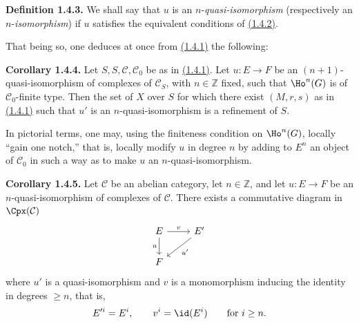 \textbf{Definition 1.4.3.} We shall say that \(u\) is an \(n\)-\emph{quasi-isomorphism} (respectively an \(n\)-\emph{isomorphism}) if \(u\) satisfies the equivalent conditions of \hyperlink{sga6.e01.lem.1-4-2}{(1.4.2)}.

That being so, one deduces at once from \hyperlink{sga6.e01.prop.1-4-1}{(1.4.1)} the following:

\textbf{Corollary 1.4.4.} Let \(S,S,\mathcal C,\mathcal C_0\) be as in \hyperlink{sga6.e01.prop.1-4-1}{(1.4.1)}. Let \(u:E\to F\) be an \((n+1)\)-quasi-isomorphism of complexes of \(\mathcal C_S\), with \(n\in\mathbb Z\) fixed, such that \(\Ho^n(G)\) is of \(\mathcal C_0\)-finite type. Then the set of \(X\) over \(S\) for which there exist \((M,r,s)\) as in \hyperlink{sga6.e01.prop.1-4-1}{(1.4.1)} such that \(u'\) is an \(n\)-quasi-isomorphism is a refinement of \(S\).

In pictorial terms, one may, using the finiteness condition on \(\Ho^n(G)\), locally ``gain one notch,'' that is, locally modify \(u\) in degree \(n\) by adding to \(E^n\) an object of \(\mathcal C_0\) in such a way as to make \(u\) an \(n\)-quasi-isomorphism.

\textbf{Corollary 1.4.5.} Let \(\mathcal C\) be an abelian category, let \(n\in\mathbb Z\), and let \(u:E\to F\) be an \(n\)-quasi-isomorphism of complexes of \(\mathcal C\). There exists a commutative diagram in \(\Cpx(\mathcal C)\)
\[
\begin{tikzcd}
E \arrow[r,"v"] \arrow[d,"u"'] & E' \arrow[dl,"u'"]\\
F &
\end{tikzcd}
\]
where \(u'\) is a quasi-isomorphism and \(v\) is a monomorphism inducing the identity in degrees \(\geq n\), that is,
\[
  E'^i=E^i,\qquad v^i=\id(E^i)\qquad\text{for }i\geq n.
\]

